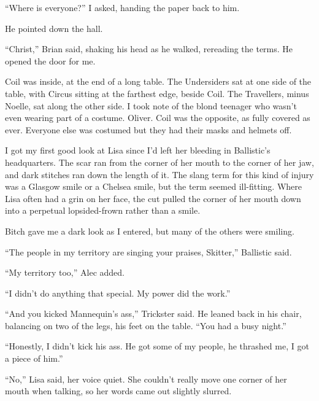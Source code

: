``Where is everyone?'' I asked, handing the paper back to him.



He pointed down the hall.



``Christ,'' Brian said, shaking his head as he walked, rereading the terms.  He opened the door for me.



Coil was inside, at the end of a long table.  The Undersiders sat at one side of the table, with Circus sitting at the farthest edge, beside Coil.  The Travellers, minus Noelle, sat along the other side.  I took note of the blond teenager who wasn't even wearing part of a costume.  Oliver.  Coil was the opposite, as fully covered as ever.  Everyone else was costumed but they had their masks and helmets off.



I got my first good look at Lisa since I'd left her bleeding in Ballistic's headquarters.  The scar ran from the corner of her mouth to the corner of her jaw, and dark stitches ran down the length of it.  The slang term for this kind of injury was a Glasgow smile or a Chelsea smile, but the term seemed ill-fitting.  Where Lisa often had a grin on her face, the cut pulled the corner of her mouth down into a perpetual lopsided-frown rather than a smile.



Bitch gave me a dark look as I entered, but many of the others were smiling.



``The people in my territory are singing your praises, Skitter,'' Ballistic said.



``My territory too,'' Alec added.



``I didn't do anything that special.  My power did the work.''



``And you kicked Mannequin's ass,'' Trickster said.  He leaned back in his chair, balancing on two of the legs, his feet on the table.  ``You had a busy night.''



``Honestly, I didn't kick his ass.  He got some of my people, he thrashed me, I got a piece of him.''



``No,'' Lisa said, her voice quiet.  She couldn't really move one corner of her mouth when talking, so her words came out slightly slurred.



